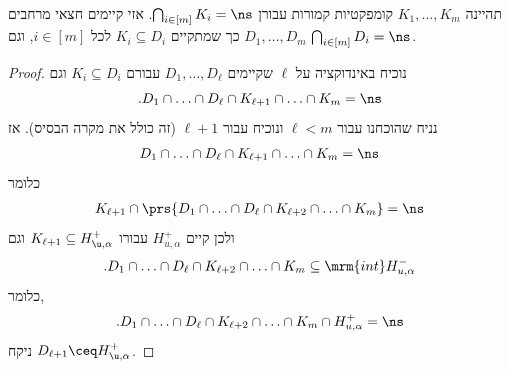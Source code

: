 \documentclass[a4paper,10pt,twoside,openany]{book}
\begin{document}
\begin{corollary}\label{corollary:disjoint_halfplanes}
תהיינה
$K_1, \ldots, K_m$
קומפקטיות קמורות עבורן
$\bigcap_{i \in [m]} K_i = \ns$.
אזי קיימים חצאי מרחבים
$D_1, \ldots, D_m$
כך שמתקיים
$K_i \subseteq D_i$
לכל
$i \in [m]$,
וגם
$\bigcap_{i \in [m]} D_i = \ns$.
\end{corollary}

\begin{proof}
נוכיח באינדוקציה על
$\ell$
שקיימים
$D_1, \ldots, D_\ell$
עבורם
$K_i \subseteq D_i$
וגם
\[\text{.} D_1 \cap \ldots \cap D_\ell \cap K_{\ell + 1} \cap \ldots \cap K_m = \ns\]
נניח שהוכחנו עבור
$\ell < m$
ונוכיח עבור
$\ell+1$
(זה כולל את מקרה הבסיס).
אז
\begin{align*}
D_1 \cap \ldots \cap D_\ell \cap K_{\ell + 1} \cap \ldots \cap K_m = \ns
\end{align*}
כלומר
\begin{align*}
K_{\ell+1} \cap \prs{D_1 \cap \ldots \cap D_{\ell} \cap K_{\ell + 2} \cap \ldots \cap K_m} = \ns
\end{align*}
ולכן קיים
$H_{u,\alpha}^+$
עבורו
$K_{\ell+1} \subseteq H_{\u,\alpha}^+$
וגם
\[\text{.} D_1 \cap \ldots \cap D_\ell \cap K_{\ell+2} \cap \ldots \cap K_m \subseteq \mrm{int}H_{u,\alpha}^-\]
כלומר,
\[\text{.} D_1 \cap \ldots \cap D_\ell \cap K_{\ell+2} \cap \ldots \cap K_m \cap H_{u,\alpha}^+ = \ns\]
ניקח
$D_{\ell+1} \ceq H_{\u,\alpha}^+$.
\end{proof}
\end{document}
